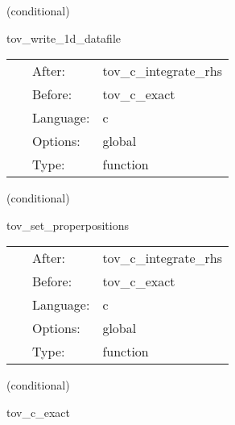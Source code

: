 \vspace{5mm}

   (conditional) 

\hspace{5mm} tov\_write\_1d\_datafile 

\hspace{5mm}{\it save data to file and exit } 


\hspace{5mm}

 \begin{tabular*}{160mm}{cll} 
~ & After:  & tov\_c\_integrate\_rhs \\ 
~ & Before:  & tov\_c\_exact \\ 
~ & Language:  & c \\ 
~ & Options:  & global \\ 
~ & Type:  & function \\ 
\end{tabular*} 


\vspace{5mm}

   (conditional) 

\hspace{5mm} tov\_set\_properpositions 

\hspace{5mm}{\it steer ns position parameters according to proper distance } 


\hspace{5mm}

 \begin{tabular*}{160mm}{cll} 
~ & After:  & tov\_c\_integrate\_rhs \\ 
~ & Before:  & tov\_c\_exact \\ 
~ & Language:  & c \\ 
~ & Options:  & global \\ 
~ & Type:  & function \\ 
\end{tabular*} 


\vspace{5mm}

   (conditional) 

\hspace{5mm} tov\_c\_exact 

\hspace{5mm}{\it set up the 3d quantities for the tov star } 


\hspace{5mm}

